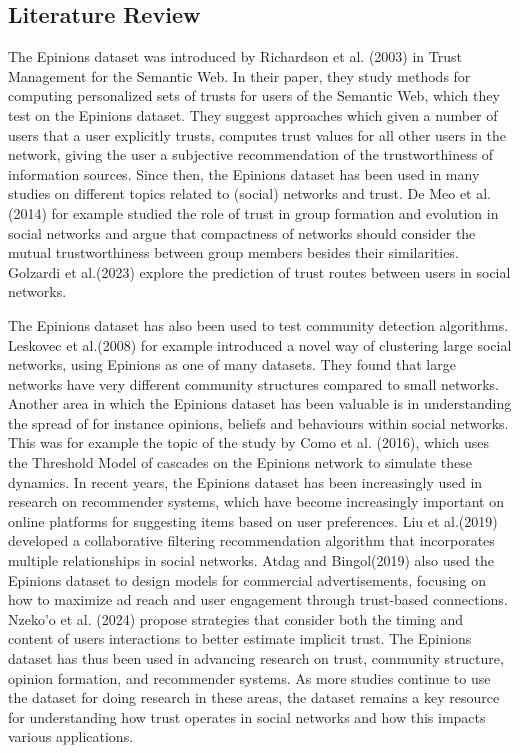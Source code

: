 \documentclass[conference]{IEEEtran}
\begin{document}
\subsection{Literature Review}
The Epinions dataset was introduced by Richardson et al. (2003)\cite{richardson2003trust} in Trust Management for the Semantic Web. In their paper, they study methods for computing personalized sets of trusts for users of the Semantic Web, which they test on the Epinions dataset. They suggest approaches which given a number of users that a user explicitly trusts, computes trust values for all other users in the network, giving the user a subjective recommendation of the trustworthiness of information sources. 
Since then, the Epinions dataset has been used in many studies on different topics related to (social) networks and trust. De Meo et al.(2014)\cite{de2014trust} for example studied the role of trust in group formation and evolution in social networks and argue that compactness of networks should consider the mutual trustworthiness between group members besides their similarities. Golzardi et al.(2023)\cite{golzardi2023trtcd} explore the prediction of trust routes between users in social networks. 

The Epinions dataset has also been used to test community detection algorithms. Leskovec et al.(2008)\cite{leskovec2008dynamics} for example introduced a novel way of clustering large social networks, using Epinions as one of many datasets. They found that large networks have very different community structures compared to small networks. Another area in which the Epinions dataset has been valuable is in understanding the spread of for instance opinions, beliefs and behaviours within social networks. This was for example the topic of the study by Como et al. (2016)\cite{como2016threshold}, which uses the Threshold Model of cascades on the Epinions network to simulate these dynamics. 
In recent years, the Epinions dataset has been increasingly used in research on recommender systems, which have become increasingly important on online platforms for suggesting items based on user preferences. Liu et al.(2019) \cite{liu2020collaborative} developed a collaborative filtering recommendation algorithm that incorporates multiple relationships in social networks. Atdag and Bingol(2019) \cite{atdag2021computational} also used the Epinions dataset to design models for commercial advertisements, focusing on how to maximize ad reach and user engagement through trust-based connections. Nzeko'o et al. (2024) \cite{nzeko2024time} propose strategies that consider both the timing and content of users interactions to better estimate implicit trust. 
The Epinions dataset has thus been used in advancing research on trust, community structure, opinion formation, and recommender systems. As more studies continue to use the dataset for doing research in these areas, the dataset remains a key resource for understanding how trust operates in social networks and how this impacts various applications.
\end{document}
